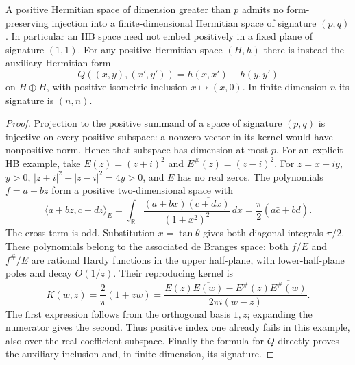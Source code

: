 \begin{proposition}
\label{v4-arith:w6-i:thm:W5-J-orthogonal}
A positive Hermitian space of dimension greater than $p$ admits no
form-preserving injection into a finite-dimensional Hermitian space
of signature $(p,q)$. In particular an HB space need not embed
positively in a fixed plane of signature $(1,1)$.
For any positive Hermitian space $(H,h)$ there is instead the
auxiliary Hermitian form
\[
 Q((x,y),(x',y'))=h(x,x')-h(y,y')
\]
on $H\oplus H$, with positive isometric inclusion $x\mapsto(x,0)$.
In finite dimension $n$ its signature is $(n,n)$.
\end{proposition}
\begin{proof}
Projection to the positive summand of a space of signature $(p,q)$
is injective on every positive subspace: a nonzero vector in its
kernel would have nonpositive norm. Hence that subspace has
dimension at most $p$.
For an explicit HB example, take $E(z)=(z+i)^2$ and
$E^\#(z)=(z-i)^2$. For $z=x+iy$, $y>0$,
$|z+i|^2-|z-i|^2=4y>0$, and $E$ has no real zeros.
The polynomials $f=a+bz$ form a positive two-dimensional space with
\[
 \langle a+bz,c+dz\rangle_E
 =\int_{\mathbb R}\frac{(a+bx)\overline{(c+dx)}}{(1+x^2)^2}\,dx
 =\frac\pi2(a\bar c+b\bar d).
\]
The cross term is odd. Substitution $x=\tan\theta$ gives both
diagonal integrals $\pi/2$. These polynomials belong to the
associated de Branges space: both $f/E$ and $f^\#/E$ are rational
Hardy functions in the upper half-plane, with lower-half-plane
poles and decay $O(1/z)$. Their reproducing kernel is
\[
 K(w,z)=\frac2\pi(1+z\bar w)
 =\frac{E(z)\overline{E(w)}-E^\#(z)\overline{E^\#(w)}}
 {2\pi i(\bar w-z)}.
\]
The first expression follows from the orthogonal basis $1,z$;
expanding the numerator gives the second. Thus positive index one
already fails in this example, also over the real coefficient
subspace. Finally the formula for $Q$ directly proves the auxiliary
inclusion and, in finite dimension, its signature.
\end{proof}

